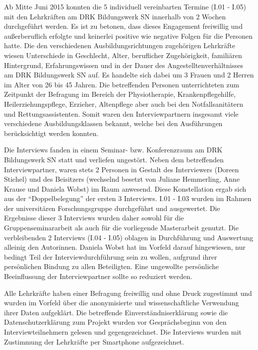 Ab Mitte Juni 2015 konnten die 5 individuell vereinbarten Termine (I.01 - I.05) mit den Lehrkräften am DRK Bildungswerk SN innerhalb von 2 Wochen durchgeführt werden. Es ist zu betonen, dass dieses Engagement freiwillig und außerberuflich erfolgte und keinerlei positive wie negative Folgen für die Personen hatte. Die den verschiedenen Ausbildungsrichtungen zugehörigen Lehrkräfte wiesen Unterschiede in Geschlecht, Alter, beruflicher Zugehörigkeit, familiären Hintergrund, Erfahrungswissen und in der Dauer des Angestelltenverhältnisses am DRK Bildungswerk SN auf. Es handelte sich dabei um 3 Frauen und 2 Herren im Alter von 26 bis 45 Jahren. Die betreffenden Personen unterrichteten zum Zeitpunkt der Befragung im Bereich der Physiotherapie, Krankenpflegehilfe, Heilerziehungspflege, Erzieher, Altenpflege aber auch bei den Notfallsanitätern und Rettungsassistenten. Somit waren den Interviewpartnern insgesamt viele verschiedene Ausbildungsklassen bekannt, welche bei den Ausführungen berücksichtigt werden konnten.

Die Interviews fanden in einem Seminar- bzw. Konferenzraum am DRK Bildungswerk SN statt und verliefen ungestört.
Neben dem betreffenden Interviewpartner, waren stets 2 Personen in Gestalt des Interviewers (Doreen Stichel) und des Beisitzers (wechselnd besetzt von Juliane Hemmerling, Anne Krause und Daniela Wobst) im Raum anwesend. Diese Konstellation ergab sich aus der "`Doppelbelegung"' der ersten 3 Interviews. I.01 - I.03 wurden im Rahmen der universitären Forschungsgruppe durchgeführt und ausgewertet. Die Ergebnisse dieser 3 Interviews wurden daher sowohl für die Gruppenseminararbeit als auch für die vorliegende Masterarbeit genutzt. Die verbleibenden 2 Interviews (I.04 - I.05) oblagen in Durchführung und Auswertung alleinig den Autorinnen. Daniela Wobst hat im Vorfeld darauf hingewiesen, nur bedingt Teil der Interviewdurchführung sein zu wollen, aufgrund ihrer persönlichen Bindung zu allen Beteiligten. Eine ungewollte persönliche Beeinflussung der Interviewpartner sollte so reduziert werden.

Alle Lehrkräfte haben einer Befragung freiwillig und ohne Druck zugestimmt und wurden im Vorfeld über die anonymisierte und wissenschaftliche Verwendung ihrer Daten aufgeklärt. Die betreffende Einverständniserklärung sowie die Datenschutzerklärung zum Projekt wurden vor Gesprächsbeginn von den Interviewteilnehmern gelesen und gegengezeichnet. Die Interviews wurden mit Zustimmung der Lehrkräfte per Smartphone aufgezeichnet. 

